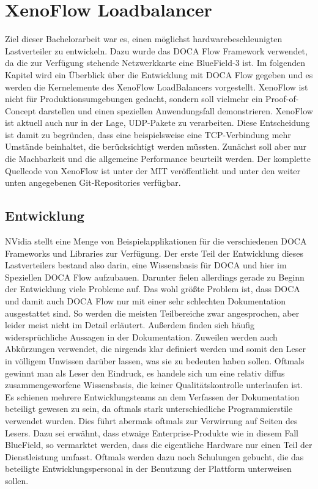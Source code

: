 \chapter{XenoFlow Loadbalancer}
\label{cha:implementation}
Ziel dieser Bachelorarbeit war es, einen möglichst hardwarebeschleunigten Lastverteiler zu entwickeln. Dazu wurde das DOCA Flow Framework verwendet, da die zur Verfügung stehende Netzwerkkarte eine BlueField-3 ist. Im folgenden Kapitel wird ein Überblick über die Entwicklung mit DOCA Flow gegeben und es werden die Kernelemente des XenoFlow LoadBalancers vorgestellt. XenoFlow ist nicht für Produktionsumgebungen gedacht, sondern soll vielmehr ein Proof-of-Concept darstellen und einen speziellen Anwendungsfall demonstrieren. XenoFlow ist aktuell auch nur in der Lage, UDP-Pakete zu verarbeiten. Diese Entscheidung ist damit zu begründen, dass eine beispielsweise eine TCP-Verbindung mehr Umstände beinhaltet, die berücksichtigt werden müssten. Zunächst soll aber nur die Machbarkeit und die allgemeine Performance beurteilt werden. Der komplette Quellcode von XenoFlow ist unter der MIT veröffentlicht und unter den weiter unten angegebenen Git-Repositories verfügbar.
\section{Entwicklung}
NVidia stellt eine Menge von Beispielapplikationen für die verschiedenen DOCA Frameworks und Libraries zur Verfügung. Der erste Teil der Entwicklung dieses Lastverteilers bestand also darin, eine Wissensbasis für DOCA und hier im Speziellen DOCA Flow aufzubauen. Darunter fielen allerdings gerade zu Beginn der Entwicklung viele Probleme auf. Das wohl größte Problem ist, dass DOCA und damit auch DOCA Flow nur mit einer sehr schlechten Dokumentation ausgestattet sind. So werden die meisten Teilbereiche zwar angesprochen, aber leider meist nicht im Detail erläutert. Außerdem finden sich häufig widersprüchliche Aussagen in der Dokumentation. Zuweilen werden auch Abkürzungen verwendet, die nirgends klar definiert werden und somit den Leser in völligem Unwissen darüber lassen, was sie zu bedeuten haben sollen. Oftmals gewinnt man als Leser den Eindruck, es handele sich um eine relativ diffus zusammengeworfene Wissensbasis, die keiner Qualitätskontrolle unterlaufen ist. Es schienen mehrere Entwicklungsteams an dem Verfassen der Dokumentation beteiligt gewesen zu sein, da oftmals stark unterschiedliche Programmierstile verwendet wurden. Dies führt abermals oftmals zur Verwirrung auf Seiten des Lesers. Dazu sei erwähnt, dass etwaige Enterprise-Produkte wie in diesem Fall BlueField, so vermarktet werden, dass die eigentliche Hardware nur einen Teil der Dienstleistung umfasst. Oftmals werden dazu noch Schulungen gebucht, die das beteiligte Entwicklungspersonal in der Benutzung der Plattform unterweisen sollen. 

